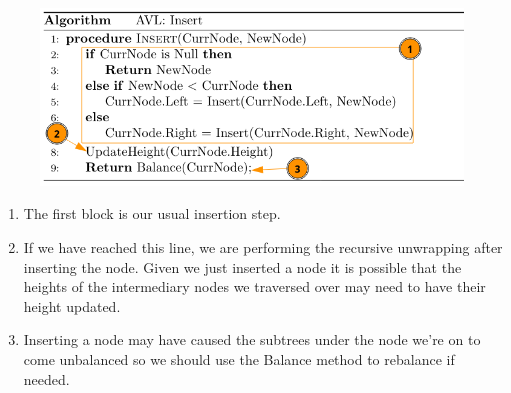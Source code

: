 \documentclass[a4paper]{article}
\begin{document}
\begin{minipage}{0.49\textwidth}
    \begin{figure}[H]
        \includegraphics[width=\textwidth]{./images/avl-insert-annotate-algo.png}
    \end{figure}
\end{minipage}
\begin{minipage}{0.49\textwidth}
    \small
    \begin{enumerate}[1)]
        \item The first block is our usual insertion step. 
        \item If we have reached this line, we are performing the recursive unwrapping after inserting the node. Given we just inserted a node it is possible that the heights of the intermediary nodes we traversed over may need to have their height updated.
        \item Inserting a node may have caused the subtrees under the node we're on to come unbalanced so we should use the Balance method to rebalance if needed.
    \end{enumerate}
\end{minipage}
\end{document}
